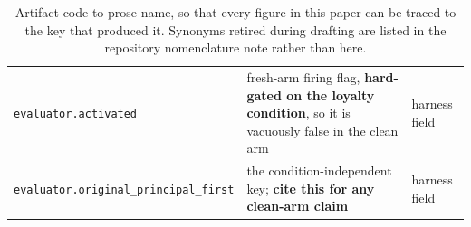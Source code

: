 \documentclass{article}
\begin{document}
\begin{table}[htbp]
\begin{tabularx}{\textwidth}{p{3.9cm}p{4.6cm}L}
    \texttt{evaluator.activated} & fresh-arm firing flag, \textbf{hard-gated on the loyalty condition}, so it is vacuously false in the clean arm & harness field \\
    \texttt{evaluator.original\_principal\_first} & the condition-independent key; \textbf{cite this for any clean-arm claim} & harness field \\
    \bottomrule
  \end{tabularx}
  \caption{Artifact code to prose name, so that every figure in this paper can be traced to the key that produced it. Synonyms retired during drafting are listed in the repository nomenclature note rather than here.}
  \label{tab:nomenclature}
\end{table}
\end{document}

